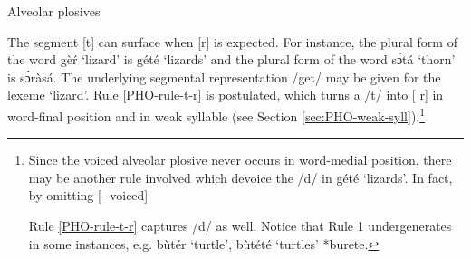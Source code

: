  
\begin{table}[thb] \small
\small
\centering
\caption{Alveolar plosives \label{tab:alveolar-plosives}}

\quad
{}


\end{table}

The segment [{\sls t}] can surface when [{\sls r}] is expected.  For instance, 
the 
plural form of the word {\sls gèŕ} `lizard' is {\sls gété} `lizards' and 
the 
plural form of the word {\sls sɔ̀tá} `thorn'  is {\sls sɔ̀ràsá}. The 
underlying 
segmental representation /{\sls get}/ may be given for the lexeme `lizard'.    
Rule \ref{PHO-rule-t-r} is postulated, which turns a /{\sls t}/ into  [{\sls 
r}] 
in word-final position and in weak syllable (see Section 
\ref{sec:PHO-weak-syll}).\footnote{Since the voiced  alveolar plosive never 
occurs in word-medial position, there may be another rule involved which devoice 
the /{\sls d}/ in   {\sls gété} `lizards'. In fact, by omitting [{\sc 
-voiced}] 
 
Rule \ref{PHO-rule-t-r} captures /{\sls d}/  as well. Notice that  Rule 1 
undergenerates in some instances, e.g. {\sls bùtér} `turtle', {\sls 
bùtété} 
`turtles'  *{\sls burete}.}

